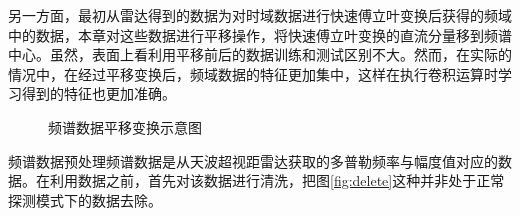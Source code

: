另一方面，最初从雷达得到的数据为对时域数据进行快速傅立叶变换后获得的频域中的数据，本章对这些数据进行平移操作，将快速傅立叶变换的直流分量移到频谱中心。虽然，表面上看利用平移前后的数据训练和测试区别不大。然而，在实际的情况中，在经过平移变换后，频域数据的特征更加集中，这样在执行卷积运算时学习得到的特征也更加准确。
\begin{figure}[hbt]
	\centering
	\hfil

	\caption{频谱数据平移变换示意图}
	\label{fig:fft}
\end{figure}

频谱数据预处理频谱数据是从天波超视距雷达获取的多普勒频率与幅度值对应的数据。在利用数据之前，首先对该数据进行清洗，把图\ref{fig:delete}这种并非处于正常探测模式下的数据去除。

